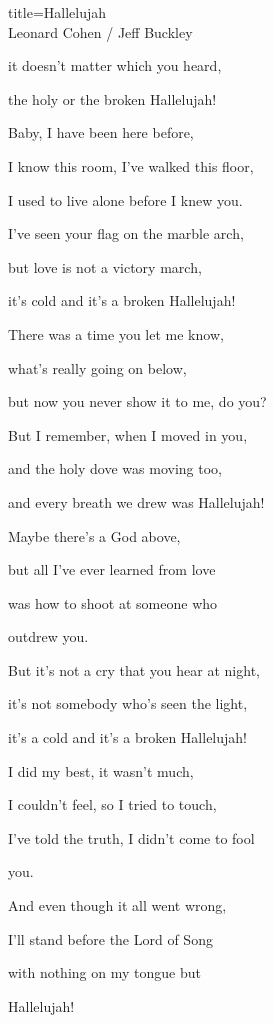 \begin{song}{title=\predtitle\centering Hallelujah \\\large Leonard Cohen / Jeff Buckley \vspace*{-0.3cm}}
\begin{centerjustified}
\begin{varwidth}[t]{0.48\textwidth}
	it doesn't matter which you heard,  
	
	the holy or the broken Hallelujah!  
	




\end{varwidth}\mezisloupci\begin{varwidth}[t]{0.5\textwidth}\setlength{\parindent}{0.45cm}  %
\vspace*{0.375cm}
\sloka
	Baby, I have been here before,  
	
	I know this room, I've walked this floor,  
	
	I used to live alone before I knew you.  
	
	I've seen your flag on the marble arch,  
	
	but love is not a victory march,  
	
	it's cold and it's a broken Hallelujah!  


\sloka
	There was a time you let me know,   
	
	what's really going on below,   
	
	but now you never show it to me, do you?   
	
	But I remember, when I moved in you,   
	
	and the holy dove was moving too,   
	
	and every breath we drew was Hallelujah!   
	

\sloka
	Maybe there's a God above,   
	
	but all I've ever learned from love   
	
	was how to shoot at someone who 

	outdrew you.   
	
	But it's not a cry that you hear at night,   
	
	it's not somebody who's seen the light,   
	
	it's a cold and it's a broken Hallelujah!   
	
\sloka
	I did my best, it wasn't much,   
	
	I couldn't feel, so I tried to touch,   
	
	I've told the truth, I didn't come to fool 

	you.   
	
	And even though it all went wrong,   
	
	I'll stand before the Lord of Song   
	
	with nothing on my tongue but 

	Hallelujah!   
	


\end{varwidth}   %

\end{centerjustified}
\setcounter{Slokočet}{0}
\end{song}
